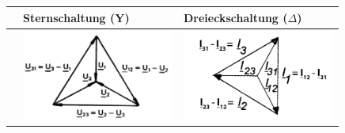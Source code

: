 				\begin{tabular}{| p{4.5cm} | l | l |}
					\hline
		 				& Sternschaltung (Y)		& Dreieckschaltung ($\Delta$)\\
		 			\hline
		 			\vspace{0.2cm}
		 				&
		 					\includegraphics[width=5cm]{images/Sternspannung.png} &
		 					\includegraphics[width=5cm]{images/Dreieckstrom.png} \\
	

\end{tabular}
